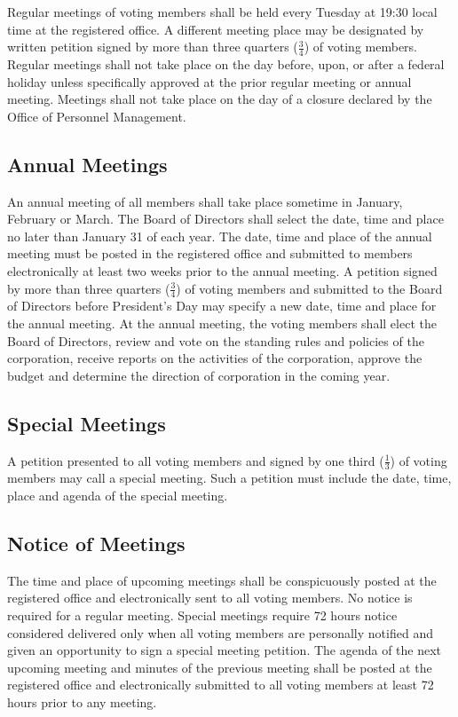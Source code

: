 \documentclass[10pt,letterpaper,titlepage]{article}
\begin{document}
Regular meetings of voting members shall be held every Tuesday at 19:30 local
time at the registered office.
A different meeting place may be designated by written petition signed by more
than three quarters ($\frac{3}{4}$) of voting members.
Regular meetings shall not take place on the day before, upon, or after a
federal holiday unless specifically approved at the prior regular meeting or
annual meeting.
Meetings shall not take place on the day of a closure declared by the Office of
Personnel Management. 

\subsection{Annual Meetings}
 
An annual meeting of all members shall take place sometime in January, February
or March.
The Board of Directors shall select the date, time and place no later than
January 31 of each year.
The date, time and place of the annual meeting must be posted in the registered
office and submitted to members electronically at least two weeks prior to the
annual meeting.
A petition signed by more than three quarters ($\frac{3}{4}$) of voting members
and submitted to the Board of Directors before President’s Day may specify a
new date, time and place for the annual meeting.
At the annual meeting, the voting members shall elect the Board of Directors,
review and vote on the standing rules and policies of the corporation, receive
reports on the activities of the corporation, approve the budget and determine
the direction of corporation in the coming year. 

\subsection{Special Meetings}
\label{specialmeet}
 
A petition presented to all voting members and signed by one third
($\frac{1}{3}$) of voting members may call a special meeting.
Such a petition must include the date, time, place and agenda of the special
meeting. 

\subsection{Notice of Meetings}
 
The time and place of upcoming meetings shall be conspicuously posted at the
registered office and electronically sent to all voting members.
No notice is required for a regular meeting.
Special meetings require 72 hours notice considered delivered only when all
voting members are personally notified and given an opportunity to sign a
special meeting petition.
The agenda of the next upcoming meeting and minutes of the previous meeting
shall be posted at the registered office and electronically submitted to all
voting members at least 72 hours prior to any meeting. 
\end{document}
